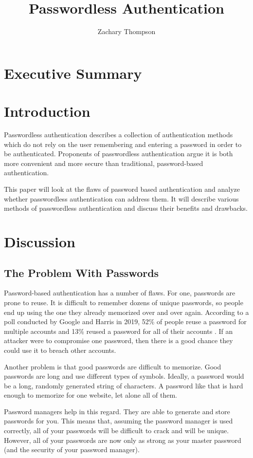 \documentclass[12pt, letterpaper]{article}
\title{Passwordless Authentication}
\author{Zachary Thompson}
\begin{document}
\maketitle

\section{Executive Summary}

\newpage
\section{Introduction}
Passwordless authentication describes a collection of authentication methods which do not rely on the user remembering and entering a password in order to be authenticated.
Proponents of passwordless authentication argue it is both more convenient and more secure than traditional, password-based authentication.

This paper will look at the flaws of password based authentication and analyze whether passwordless authentication can address them.
It will describe various methods of passwordless authentication and discuss their benefits and drawbacks.

\newpage
\section{Discussion}
\subsection{The Problem With Passwords}
Password-based authentication has a number of flaws.
For one, passwords are prone to reuse.
It is difficult to remember dozens of unique passwords, so people end up using the one they already memorized over and over again.
According to a poll conducted by Google and Harris in 2019, 52\% of people reuse a password for multiple accounts and 13\% reused a password for all of their accounts \parencite{googleharris2019poll}.
If an attacker were to compromise one password, then there is a good chance they could use it to breach other accounts.

Another problem is that good passwords are difficult to memorize.
Good passwords are long and use different types of symbols.
Ideally, a password would be a long, randomly generated string of characters.
A password like that is hard enough to memorize for one website, let alone all of them.

Password managers help in this regard.
They are able to generate and store passwords for you.
This means that, assuming the password manager is used correctly, all of your passwords will be difficult to crack and will be unique. 
However, all of your passwords are now only as strong as your master password (and the security of your password manager).
\end{document}
